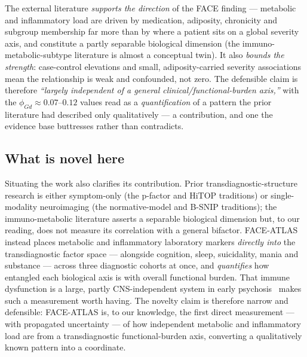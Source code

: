 \begin{keyresult}
The external literature \emph{supports the direction} of the FACE finding --- metabolic and inflammatory load
are driven by medication, adiposity, chronicity and subgroup membership far more than by where a patient sits
on a global severity axis, and constitute a partly separable biological dimension (the immuno-metabolic-subtype
literature is almost a conceptual twin). It also \emph{bounds the strength}: case-control elevations and small,
adiposity-carried severity associations mean the relationship is weak and confounded, not zero. The defensible
claim is therefore \emph{``largely independent of a general clinical/functional-burden axis,''} with the
$\phi_{Gd}\approx 0.07$--$0.12$ values read as a \emph{quantification} of a pattern the prior literature had
described only qualitatively --- a contribution, and one the evidence base buttresses rather than contradicts.
\end{keyresult}

\subsection{What is novel here}
Situating the work also clarifies its contribution. Prior transdiagnostic-structure research is either
symptom-only (the p-factor and HiTOP traditions) or single-modality neuroimaging (the normative-model and
B-SNIP traditions); the immuno-metabolic literature asserts a separable biological dimension but, to our
reading, does not measure its correlation with a general bifactor. FACE-ATLAS instead places metabolic and
inflammatory laboratory markers \emph{directly into} the transdiagnostic factor space --- alongside cognition,
sleep, suicidality, mania and substance --- across three diagnostic cohorts at once, and \emph{quantifies} how
entangled each biological axis is with overall functional burden. That immune dysfunction is a large,
partly CNS-independent system in early psychosis~\cite{pillinger2019multisystem} makes such a measurement
worth having. The novelty claim is therefore narrow and defensible: FACE-ATLAS is, to our knowledge, the first
direct measurement --- with propagated uncertainty --- of how independent metabolic and inflammatory load are
from a transdiagnostic functional-burden axis, converting a qualitatively known pattern into a coordinate.
